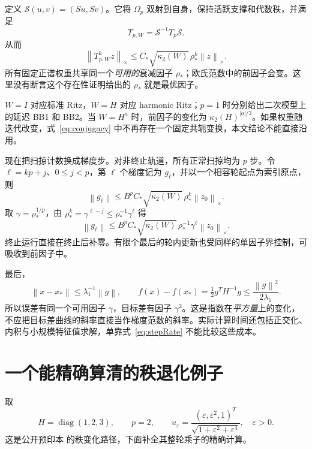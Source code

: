 \documentclass[UTF8,zihao=-4,a4paper]{ctexart}
\theoremstyle{definition}\newtheorem{example}[theorem]{例}
\newcommand{\norm}[1]{\left\lVert#1\right\rVert}
\DeclareMathOperator{\diag}{diag}\DeclareMathOperator{\Span}{span}\DeclareMathOperator{\rank}{rank}
\begin{document}
定义 $\mathcal S(u,v)=(Su,Sv)$。它将 $\Omega_p$ 双射到自身，保持活跃支撑和代数秩，并满足
\begin{equation}\label{eq:conjugacy}
 T_{p,W}=\mathcal S^{-1}T_p\mathcal S.
\end{equation}
从而
\begin{equation}\label{eq:weighted}
 \norm{T_{p,W}^kz}_\times
 \le C_*\sqrt{\kappa_2(W)}\,\rho_*^k\norm z_\times.
\end{equation}
所有固定正谱权重共享同一个\emph{可用的}衰减因子 $\rho_*$；欧氏范数中的前因子会变。这里没有断言这个存在性证明给出的 $\rho_*$ 就是最优因子。

$W=I$ 对应标准 Ritz，$W=H$ 对应 harmonic Ritz；$p=1$ 时分别给出二次模型上的延迟 BB1 和 BB2。当 $W=H^a$ 时，前因子的变化为 $\kappa_2(H)^{|a|/2}$。如果权重随迭代改变，式~\eqref{eq:conjugacy} 中不再存在一个固定共轭变换，本文结论不能直接沿用。

现在把扫掠计数换成梯度步。对非终止轨道，所有正常扫掠均为 $p$ 步。令 $\ell=kp+j$、$0\le j<p$，第 $\ell$ 个梯度记为 $g_\ell$，并以一个相容轮起点为索引原点，则
\[
 \norm{g_\ell}\le B^p C_*\sqrt{\kappa_2(W)}\,
                  \rho_*^k\norm{z_0}_\times.
\]
取 $\gamma=\rho_*^{1/p}$，由 $\rho_*^k=\gamma^{\ell-j}\le\rho_*^{-1}\gamma^\ell$ 得
\begin{equation}\label{eq:stepRate}
 \norm{g_\ell}\le
 B^p C_*\sqrt{\kappa_2(W)}\,\rho_*^{-1}
 \gamma^\ell\norm{z_0}_\times.
\end{equation}
终止运行直接在终止后补零。有限个最后的轮内更新也受同样的单因子界控制，可吸收到前因子中。

最后，
\[
 \norm{x-x_*}\le\lambda_1^{-1}\norm g,
 \qquad f(x)-f(x_*)=\tfrac12g^TH^{-1}g
                   \le\frac{\norm g^2}{2\lambda_1}.
\]
所以误差有同一个可用因子 $\gamma$，目标差有因子 $\gamma^2$。这是指数在\emph{平方量}上的变化，不应把目标差曲线的斜率直接当作梯度范数的斜率。实际计算时间还包括正交化、内积与小规模特征值求解，单靠式~\eqref{eq:stepRate} 不能比较这些成本。

\section{一个能精确算清的秩退化例子}

取
\begin{equation}\label{eq:example}
 H=\diag(1,2,3),\qquad p=2,\qquad
 u_\varepsilon=\frac{(\varepsilon,\varepsilon^2,1)^T}
                   {\sqrt{1+\varepsilon^2+\varepsilon^4}},\quad\varepsilon>0.
\end{equation}
这是公开预印本 \cite[Proposition 9]{YY2026} 的秩变化路径，下面补全其整轮乘子的精确计算。
\end{document}
